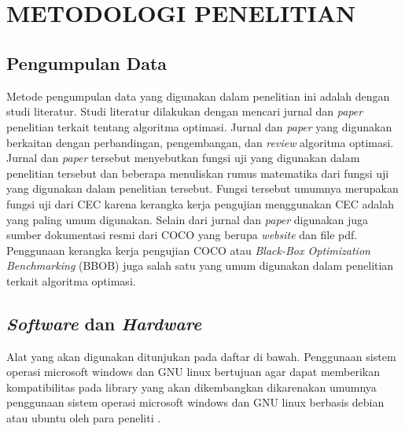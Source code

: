 
\chapter[METODOLOGI PENELITIAN]{\\ METODOLOGI PENELITIAN}

\section{Pengumpulan Data}
Metode pengumpulan data yang digunakan dalam penelitian ini adalah dengan studi literatur. Studi literatur dilakukan dengan mencari jurnal dan \textit{paper} penelitian terkait tentang algoritma optimasi. Jurnal dan \textit{paper} yang digunakan berkaitan dengan perbandingan, pengembangan, dan \textit{review} algoritma optimasi. Jurnal dan \textit{paper} tersebut menyebutkan fungsi uji yang digunakan dalam penelitian tersebut dan beberapa menuliskan rumus matematika dari fungsi uji yang digunakan dalam penelitian tersebut. Fungsi tersebut umumnya merupakan fungsi uji dari CEC karena kerangka kerja pengujian menggunakan CEC adalah yang paling umum digunakan. Selain dari jurnal dan \textit{paper} digunakan juga sumber dokumentasi resmi dari COCO yang berupa \textit{website} dan file pdf. Penggunaan kerangka kerja pengujian COCO atau \textit{Black-Box Optimization Benchmarking} (BBOB) juga salah satu yang umum digunakan dalam penelitian terkait algoritma optimasi.

\section{\textit{Software} dan \textit{Hardware}}
Alat yang akan digunakan ditunjukan pada daftar di bawah. Penggunaan sistem operasi microsoft windows dan GNU linux bertujuan agar dapat memberikan kompatibilitas pada library yang akan dikembangkan dikarenakan umumnya penggunaan sistem operasi microsoft windows dan GNU linux berbasis debian atau ubuntu oleh para peneliti \citep{arora_2020} \citep{stackoverflow}.

